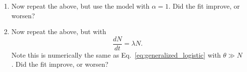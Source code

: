 \documentclass{exam}
\begin{document}
\begin{enumerate}[a]
\item Now repeat the above, but use the model with $\alpha=1$. Did the fit improve, or worsen?
\item Now repeat the above, but with 
  \begin{equation}
    \frac{dN}{dt} = \lambda N. 
  \end{equation}
Note this is numerically the same as Eq.~\ref{eq:generalized_logistic} with $\theta \gg N$ . Did the fit improve, or worsen?
\end{enumerate}
 

  
\end{document}
